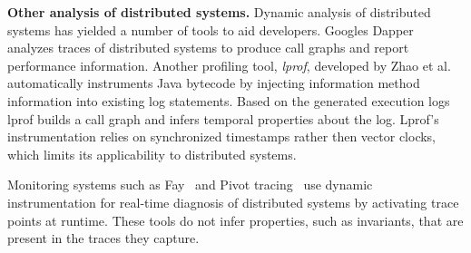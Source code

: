 

\textbf{Other analysis of distributed systems.} Dynamic analysis of
distributed systems has yielded a number of tools to aid
developers. Googles Dapper~\cite{Dapper} analyzes traces of
distributed systems to produce call graphs and report performance
information. 
%
%
Another profiling tool, \textit{lprof}, developed by Zhao et
al.~\cite{Zhao:2014:LNR:2685048.2685099} automatically instruments
Java bytecode by injecting information method information into
existing log statements. Based on the generated execution logs lprof
builds a call graph and infers temporal properties about the
log. Lprof's instrumentation relies on synchronized timestamps rather
then vector clocks, which limits its applicability to distributed
systems.


Monitoring systems such as Fay~\cite{Fay2011} and Pivot
tracing~\cite{Mace2015} use dynamic instrumentation for real-time
diagnosis of distributed systems by activating trace points at
runtime. %
These tools do not infer properties, such as invariants, that are
present in the traces they capture.

